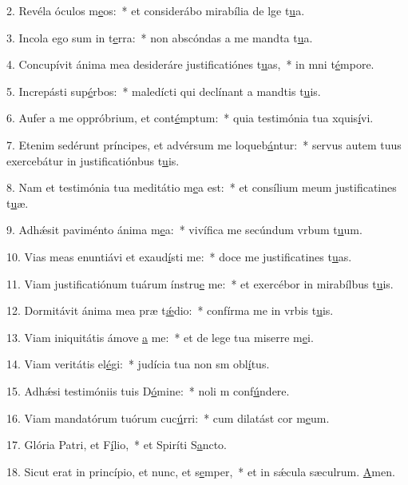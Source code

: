 2. Revéla óculos m\uline{e}os:~* et considerábo mirabília de lge t\uline{u}a.\par 
3. Incola ego sum in t\uline{e}rra:~* non abscóndas a me mandta t\uline{u}a.\par 
4. Concupívit ánima mea desideráre justificatiónes t\uline{u}as,~* in mni t\uline{é}mpore.\par 
5. Increpásti sup\uline{é}rbos:~* maledícti qui declínant a mandtis t\uline{u}is.\par 
6. Aufer a me oppróbrium, et cont\uline{é}mptum:~* quia testimónia tua xquis\uline{í}vi.\par 
7. Etenim sedérunt príncipes, et advérsum me loqueb\uline{á}ntur:~* servus autem tuus exercebátur in justificatiónbus t\uline{u}is.\par 
8. Nam et testimónia tua meditátio m\uline{e}a est:~* et consílium meum justificatines t\uline{u}æ.\par 
9. Adhǽsit paviménto ánima m\uline{e}a:~* vivífica me secúndum vrbum t\uline{u}um.\par 
10. Vias meas enuntiávi et exaud\uline{í}sti me:~* doce me justificatines t\uline{u}as.\par 
11. Viam justificatiónum tuárum ínstru\uline{e} me:~* et exercébor in mirabílbus t\uline{u}is.\par 
12. Dormitávit ánima mea præ t\uline{ǽ}dio:~* confírma me in vrbis t\uline{u}is.\par 
13. Viam iniquitátis ámove \uline{a} me:~* et de lege tua miserre m\uline{e}i.\par 
14. Viam veritátis el\uline{é}gi:~* judícia tua non sm obl\uline{í}tus.\par 
15. Adhǽsi testimóniis tuis D\uline{ó}mine:~* noli m conf\uline{ú}ndere.\par 
16. Viam mandatórum tuórum cuc\uline{ú}rri:~* cum dilatást cor m\uline{e}um.\par 
17. Glória Patri, et F\uline{í}lio,~* et Spiríti S\uline{a}ncto.\par 
18. Sicut erat in princípio, et nunc, et s\uline{e}mper,~* et in sǽcula sæculrum. \uline{A}men.\par 
